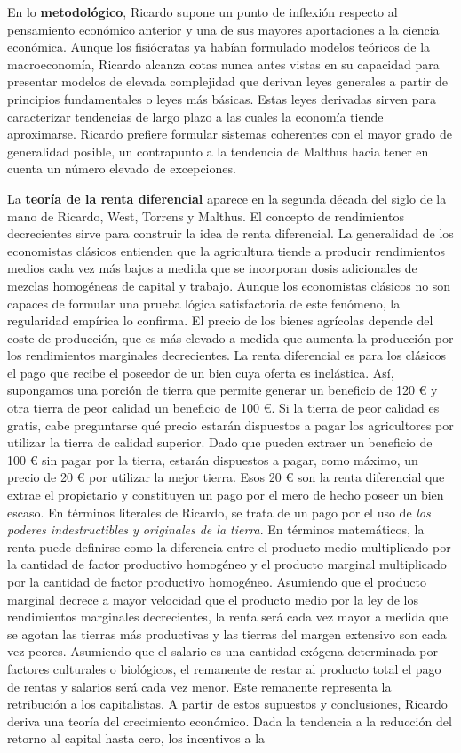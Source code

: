 \documentclass{nuevotema}
\begin{document}
En lo \textbf{metodológico}, Ricardo supone un punto de inflexión respecto al pensamiento económico anterior y una de sus mayores aportaciones a la ciencia económica. Aunque los fisiócratas ya habían formulado modelos teóricos de la macroeconomía, Ricardo alcanza cotas nunca antes vistas en su capacidad para presentar modelos de elevada complejidad que derivan leyes generales a partir de principios fundamentales o leyes más básicas. Estas leyes derivadas sirven para caracterizar tendencias de largo plazo a las cuales la economía tiende aproximarse. Ricardo prefiere formular sistemas coherentes con el mayor grado de generalidad posible, un contrapunto a la tendencia de Malthus hacia tener en cuenta un número elevado de excepciones.

La \textbf{teoría de la renta diferencial} aparece en la segunda década del siglo de la mano de Ricardo, West, Torrens y Malthus. El concepto de rendimientos decrecientes sirve para construir la idea de renta diferencial. La generalidad de los economistas clásicos entienden que la agricultura tiende a producir rendimientos medios cada vez más bajos a medida que se incorporan dosis adicionales de mezclas homogéneas de capital y trabajo. Aunque los economistas clásicos no son capaces de formular una prueba lógica satisfactoria de este fenómeno, la regularidad empírica lo confirma. El precio de los bienes agrícolas depende del coste de producción, que es más elevado a medida que aumenta la producción por los rendimientos marginales decrecientes. La renta diferencial es para los clásicos el pago que recibe el poseedor de un bien cuya oferta es inelástica. Así, supongamos una porción de tierra que permite generar un beneficio de 120 € y otra tierra de peor calidad un beneficio de 100 €. Si la tierra de peor calidad es gratis, cabe preguntarse qué precio estarán dispuestos a pagar los agricultores por utilizar la tierra de calidad superior. Dado que pueden extraer un beneficio de 100 € sin pagar por la tierra, estarán dispuestos a pagar, como máximo, un precio de 20 € por utilizar la mejor tierra. Esos 20 € son la renta diferencial que extrae el propietario y constituyen un pago por el mero de hecho poseer un bien escaso. En términos literales de Ricardo, se trata de un pago por el uso de \textit{los poderes indestructibles y originales de la tierra}. En términos matemáticos, la renta puede definirse como la diferencia entre el producto medio multiplicado por la cantidad de factor productivo homogéneo y el producto marginal multiplicado por la cantidad de factor productivo homogéneo. Asumiendo que el producto marginal decrece a mayor velocidad que el producto medio por la ley de los rendimientos marginales decrecientes, la renta será cada vez mayor a medida que se agotan las tierras más productivas y las tierras del margen extensivo son cada vez peores. Asumiendo que el salario es una cantidad exógena determinada por factores culturales o biológicos, el remanente de restar al producto total el pago de rentas y salarios será cada vez menor. Este remanente representa la retribución a los capitalistas. A partir de estos supuestos y conclusiones, Ricardo deriva una teoría del crecimiento económico. Dada la tendencia a la reducción del retorno al capital hasta cero, los incentivos a la 
\end{document}
